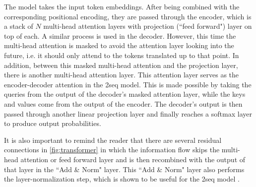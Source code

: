 The model takes the input token embeddings.
After being combined with the corresponding positional encoding, they are passed through the encoder, which is a stack of $N$ multi-head attention layers with projection (``feed forward") layer on top of each.
A similar process is used in the decoder.
However, this time the multi-head attention is masked to avoid the attention layer looking into the future, i.e. it should only attend to the tokens translated up to that point.
In addition, between this masked multi-head attention and the projection layer, there is another multi-head attention layer. 
This attention layer serves as the encoder-decoder attention in the \seq2seq model.
This is made possible by taking the queries from the output of the decoder's masked attention layer, while the keys and values come from the output of the encoder.
The decoder's output is then passed through another linear projection layer and finally reaches a softmax layer to produce output probabilities.

It is also important to remind the reader that there are several residual connections in \cref{fig:transformer} in which the information flow skips the multi-head attention or feed forward layer and is then recombined with the output of that layer in the ``Add \& Norm" layer.
This ``Add \& Norm" layer also performs the layer-normalization step, which is shown to be useful for the \seq2seq model \citep{ba2016layer}.
